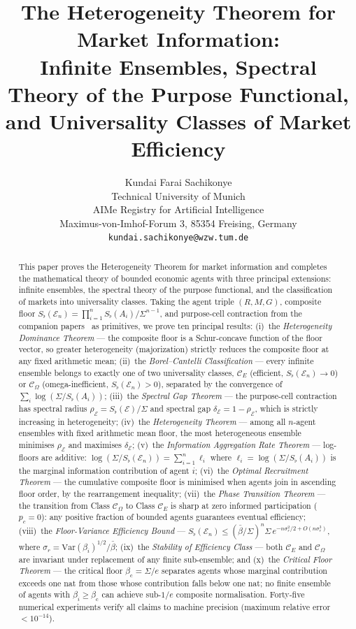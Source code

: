 \documentclass[twocolumn,11pt,a4paper]{article}
\title{\textbf{The Heterogeneity Theorem for Market Information:\\
Infinite Ensembles, Spectral Theory of the Purpose Functional,\\
and Universality Classes of Market Efficiency}}
\author{Kundai Farai Sachikonye\\[4pt]
\small Technical University of Munich\\
\small AIMe Registry for Artificial Intelligence\\
\small Maximus-von-Imhof-Forum 3, 85354 Freising, Germany\\
\small \texttt{kundai.sachikonye@wzw.tum.de}}
\date{}
\theoremstyle{remark}
\newcommand{\Sflat}{S_{\flat}}
\newcommand{\Ens}{\mathcal{E}}
\newcommand{\srad}{\rho}                  %
\newcommand{\sgap}{\delta}                %
\newcommand{\ClassE}{\mathcal{C}_E}       %
\newcommand{\ClassO}{\mathcal{C}_\Omega}  %
\newcommand{\logfl}{\ell}                 %
\newcommand{\Var}{\mathrm{Var}}           %
\newcommand{\CV}{\sigma_r}               %
\newcommand{\Crit}{\beta_{\mathrm{c}}}   %
\begin{document}
\maketitle

\begin{abstract}
\noindent
This paper proves the Heterogeneity Theorem for market information and
completes the mathematical theory of bounded economic agents with three
principal extensions: infinite ensembles, the spectral theory of the purpose
functional, and the classification of markets into universality classes.
Taking the agent triple $(R,M,G)$, composite floor
$\Sflat(\Ens_n) = \prod_{i=1}^n \Sflat(A_i)/\Sigma^{n-1}$, and
purpose-cell contraction from the companion
papers~\cite{sachikonye2025agents,sachikonye2025market} as primitives, we
prove ten principal results:
(i)~the \emph{Heterogeneity Dominance Theorem} --- the composite floor is a
Schur-concave function of the floor vector, so greater heterogeneity
(majorization) strictly reduces the composite floor at any fixed arithmetic
mean;
(ii)~the \emph{Borel--Cantelli Classification} --- every infinite ensemble
belongs to exactly one of two universality classes, $\ClassE$ (efficient,
$\Sflat(\Ens_n)\to 0$) or $\ClassO$ (omega-inefficient, $\Sflat(\Ens_n)>0$),
separated by the convergence of $\sum_i \log(\Sigma/\Sflat(A_i))$;
(iii)~the \emph{Spectral Gap Theorem} --- the purpose-cell contraction has
spectral radius $\srad_\Ens = \Sflat(\Ens)/\Sigma$ and spectral gap
$\sgap_\Ens = 1 - \srad_\Ens$, which is strictly increasing in
heterogeneity;
(iv)~the \emph{Heterogeneity Theorem} --- among all $n$-agent ensembles with
fixed arithmetic mean floor, the most heterogeneous ensemble minimises
$\srad_\Ens$ and maximises $\sgap_\Ens$;
(v)~the \emph{Information Aggregation Rate Theorem} --- log-floors are
additive: $\log(\Sigma/\Sflat(\Ens_n)) = \sum_{i=1}^n \logfl_i$ where
$\logfl_i = \log(\Sigma/\Sflat(A_i))$ is the marginal information
contribution of agent $i$;
(vi)~the \emph{Optimal Recruitment Theorem} --- the cumulative composite
floor is minimised when agents join in ascending floor order, by the
rearrangement inequality;
(vii)~the \emph{Phase Transition Theorem} --- the transition from Class
$\ClassO$ to Class $\ClassE$ is sharp at zero informed participation
($p_c=0$): any positive fraction of bounded agents guarantees eventual
efficiency;
(viii)~the \emph{Floor-Variance Efficiency Bound} ---
$\Sflat(\Ens_n) \le (\bar{\beta}/\Sigma)^n \Sigma\,
e^{-n\CV^2/2+O(n\CV^3)}$, where $\CV = \Var(\beta_i)^{1/2}/\bar\beta$;
(ix)~the \emph{Stability of Efficiency Class} --- both $\ClassE$ and
$\ClassO$ are invariant under replacement of any finite sub-ensemble;
and
(x)~the \emph{Critical Floor Theorem} --- the critical floor
$\Crit = \Sigma/e$ separates agents whose marginal contribution exceeds one
nat from those whose contribution falls below one nat; no finite ensemble
of agents with $\beta_i \ge \Crit$ can achieve sub-$1/e$ composite
normalisation.
Forty-five numerical experiments verify all claims to machine precision
(maximum relative error $< 10^{-14}$).
\end{abstract}
\end{document}
